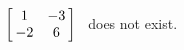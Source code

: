 {$\left[\hskip -3pt \begin{array}{cc} 1&-3\\  -2&6\end {array} \hskip -3pt
 \right] $
 }
{\ttai\ does not exist.}
